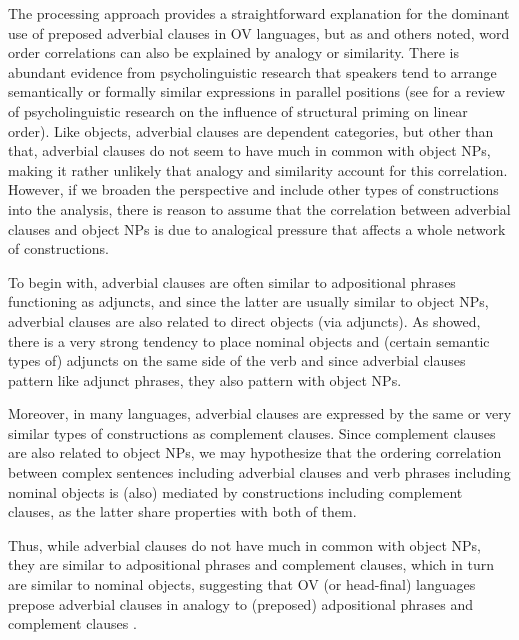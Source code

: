 \documentclass[output=paper]{langsci/langscibook}
\begin{document}
The processing approach provides a straightforward explanation for the dominant use of preposed adverbial clauses in OV languages, but as \citet{Krifka1985} and others noted, word order correlations can also be explained by analogy or similarity. There is abundant evidence from psycholinguistic research that speakers tend to arrange semantically or formally similar expressions in parallel positions (see \citealt{PickeringFerreira2008} for a review of psycholinguistic research on the influence of structural priming on linear order). Like objects, adverbial clauses are dependent categories, but other than that, adverbial clauses do not seem to have much in common with object NPs, making it rather unlikely that analogy and similarity account for this correlation. However, if we broaden the perspective and include other types of constructions into the analysis, there is reason to assume that the correlation between adverbial clauses and object NPs is due to analogical pressure that affects a whole network of constructions.

To begin with, adverbial clauses are often similar to adpositional phrases functioning as adjuncts, and since the latter are usually similar to object NPs, adverbial clauses are also related to direct objects (via adjuncts). As \citet{Dryer1992} showed, there is a very strong tendency to place nominal objects and (certain semantic types of) adjuncts on the same side of the verb and since adverbial clauses pattern like adjunct phrases, they also pattern with object NPs. 

Moreover, in many languages, adverbial clauses are expressed by the same or very similar types of constructions as complement clauses. Since complement clauses are also related to object NPs, we may hypothesize that the ordering correlation between complex sentences including adverbial clauses and verb phrases including nominal objects is (also) mediated by constructions including complement clauses, as the latter share properties with both of them.

Thus, while adverbial clauses do not have much in common with object NPs, they are similar to adpositional phrases and complement clauses, which in turn are similar to nominal objects, suggesting that OV (or head-final) languages prepose adverbial clauses in analogy to (preposed) adpositional phrases and complement clauses .

\ea\label{ex:diessel:17}~\\
\z
\end{document}
